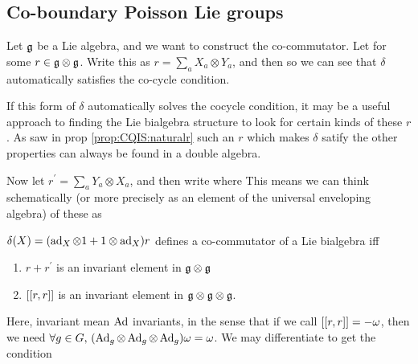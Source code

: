 \documentclass{article}
\begin{document}
\subsection{Co-boundary Poisson Lie groups}
Let $\mf{g}$ be a Lie algebra, and we want to construct the co-commutator. Let 
for some $r \in \mf{g} \otimes \mf{g}$. Write this as $r = \sum_a X_a \otimes Y_a$, and then 
so we can see that $\delta$ automatically satisfies the co-cycle condition.
\begin{idea}
If this form of $\delta$ automatically solves the cocycle condition, it may be a useful approach to finding the Lie bialgebra structure to look for certain kinds of these $r$. As saw in prop \ref{prop:CQIS:naturalr} such an $r$ which makes $\delta$ satify the other properties can always be found in a double algebra.
\end{idea}
Now let $r^\prime = \sum_a Y_a \otimes X_a$, and then write 
where 
This means we can think schematically (or more precisely as an element of the universal enveloping algebra) of these as 

\begin{lemma}
$\delta(X) = (\ad_X \otimes 1 + 1 \otimes \ad_X) r$ defines a co-commutator of a Lie bialgebra iff
\begin{enumerate}
    \item $r + r^\prime$ is an invariant element in $\mf{g} \otimes \mf{g}$
    \item $\comm[[r]{r]}$ is an invariant element in $\mf{g} \otimes \mf{g} \otimes \mf{g}$. 
\end{enumerate}
\end{lemma}
Here, invariant mean $\Ad$ invariants, in the sense that if we call $\comm[[r]{r]} = -\omega$, then we need $\forall g \in G,\, (\Ad_g \otimes \Ad_g \otimes \Ad_g) \omega = \omega$. We may differentiate to get the condition 
\end{document}

